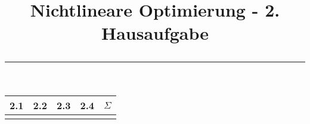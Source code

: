 \documentclass[11p,a4paper]{article}
\begin{document}
\title{\textbf{Nichtlineare Optimierung - 2. Hausaufgabe} \\ \rule{\textwidth}{1pt}}
\date{}

\clearpage\maketitle
\thispagestyle{empty}
\ourtitle
\setcounter{page}{0}

\vspace{2.5cm}
\begin{center}
\huge
\begin{tabular}{c*{3}{|c}||c}
2.1 & 2.2 & 2.3 & 2.4 & $\Sigma$ \\\hline
&&&& \\
\end{tabular}
\end{center}
\vspace{2cm}






%
\end{document}
